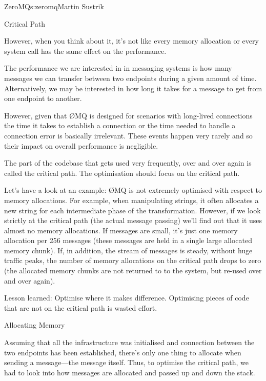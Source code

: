 \begin{aosachapter}{ZeroMQ}{s:zeromq}{Martin Sustrik}
\begin{aosasect1}{Critical Path}
\begin{aosaitemize}
\end{aosaitemize}

However, when you think about it, it's not like every memory
allocation or every system call has the same effect on the
performance.

The performance we are interested in in messaging systems is how many
messages we can transfer between two endpoints during a given amount
of time. Alternatively, we may be interested in how long it takes for
a message to get from one endpoint to another.

However, given that {\O}MQ is designed for scenarios with long-lived
connections the time it takes to establish a connection or the time
needed to handle a connection error is basically irrelevant. These
events happen very rarely and so their impact on overall performance
is negligible.

The part of the codebase that gets used very frequently, over and over
again is called the critical path. The optimisation should focus on
the critical path.

Let's have a look at an example: {\O}MQ is not extremely optimised with
respect to memory allocations. For example, when manipulating strings,
it often allocates a new string for each intermediate phase of the
transformation. However, if we look strictly at the critical path (the
actual message passing) we'll find out that it uses almost no memory
allocations. If messages are small, it's just one memory allocation
per 256 messages (these messages are held in a single large allocated
memory chunk). If, in addition, the stream of messages is steady,
without huge traffic peaks, the number of memory allocations on the
critical path drops to zero (the allocated memory chunks are not
returned to to the system, but re-used over and over again).

Lesson learned: Optimise where it makes difference. Optimising pieces
of code that are not on the critical path is wasted effort.

\end{aosasect1}

\begin{aosasect1}{Allocating Memory}

Assuming that all the infrastructure was initialised and connection
between the two endpoints has been established, there's only one thing
to allocate when sending a message---the message itself. Thus, to
optimise the critical path, we had to look into how messages are
allocated and passed up and down the stack.


\end{aosasect1}
\end{aosachapter}
